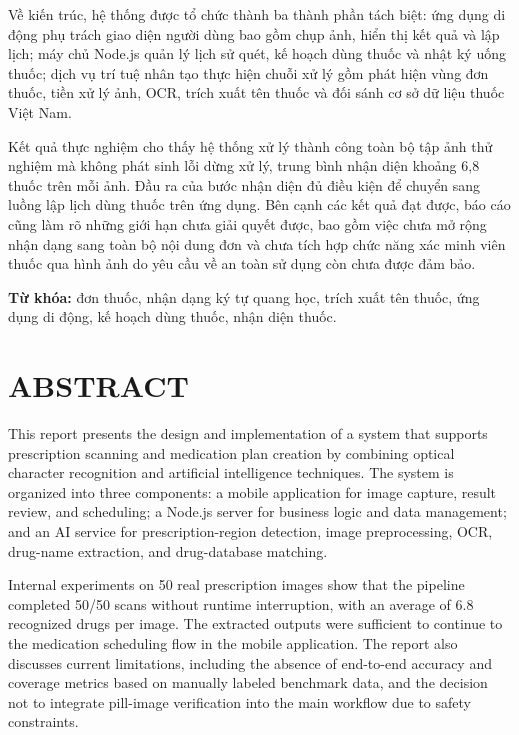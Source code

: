 \documentclass[12pt,a4paper]{report}
\begin{document}
Về kiến trúc, hệ thống được tổ chức thành ba thành phần tách biệt: ứng dụng di động phụ trách giao diện người dùng bao gồm chụp ảnh, hiển thị kết quả và lập lịch; máy chủ Node.js quản lý lịch sử quét, kế hoạch dùng thuốc và nhật ký uống thuốc; dịch vụ trí tuệ nhân tạo thực hiện chuỗi xử lý gồm phát hiện vùng đơn thuốc, tiền xử lý ảnh, OCR, trích xuất tên thuốc và đối sánh cơ sở dữ liệu thuốc Việt Nam.

Kết quả thực nghiệm cho thấy hệ thống xử lý thành công toàn bộ tập ảnh thử nghiệm mà không phát sinh lỗi dừng xử lý, trung bình nhận diện khoảng 6,8 thuốc trên mỗi ảnh. Đầu ra của bước nhận diện đủ điều kiện để chuyển sang luồng lập lịch dùng thuốc trên ứng dụng. Bên cạnh các kết quả đạt được, báo cáo cũng làm rõ những giới hạn chưa giải quyết được, bao gồm việc chưa mở rộng nhận dạng sang toàn bộ nội dung đơn và chưa tích hợp chức năng xác minh viên thuốc qua hình ảnh do yêu cầu về an toàn sử dụng còn chưa được đảm bảo.

\noindent\textbf{Từ khóa:} đơn thuốc, nhận dạng ký tự quang học, trích xuất tên thuốc, ứng dụng di động, kế hoạch dùng thuốc, nhận diện thuốc.

\chapter*{ABSTRACT}

This report presents the design and implementation of a system that supports prescription scanning and medication plan creation by combining optical character recognition and artificial intelligence techniques. The system is organized into three components: a mobile application for image capture, result review, and scheduling; a Node.js server for business logic and data management; and an AI service for prescription-region detection, image preprocessing, OCR, drug-name extraction, and drug-database matching.

Internal experiments on 50 real prescription images show that the pipeline completed 50/50 scans without runtime interruption, with an average of 6.8 recognized drugs per image. The extracted outputs were sufficient to continue to the medication scheduling flow in the mobile application. The report also discusses current limitations, including the absence of end-to-end accuracy and coverage metrics based on manually labeled benchmark data, and the decision not to integrate pill-image verification into the main workflow due to safety constraints.
\end{document}

